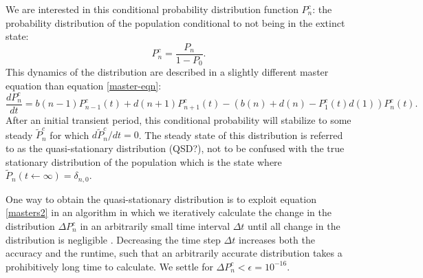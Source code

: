 \documentclass[a4paper,10pt]{article}
\numberwithin{equation}{section} %
\begin{document}
We are interested in this conditional probability distribution function $P_n^c$: the probability distribution of the population conditional to not being in the extinct state: %
\begin{equation*}
P_n^c = \frac{P_n}{1-P_0}.
\end{equation*}
This dynamics of the distribution are described in a slightly different master equation than equation \ref{master-eqn}:
\begin{equation}
\frac{dP_n^c}{dt} =  b(n-1)P_{n-1}^c(t) + d(n+1)P_{n+1}^c(t) - (b(n) + d(n) - P_1^c(t)d(1))P_n^c(t). 
\label{masters2}
\end{equation}
After an initial transient period, this conditional probability will stabilize to some steady $\tilde{P}^c_n$ for which $d\tilde{P}_n^c/dt=0$. 
The steady state of this distribution is referred to as the quasi-stationary distribution (QSD?), not to be confused with the true stationary distribution of the population which is the state where $\tilde{P}_n(t \leftarrow \infty)=\delta_{n,0}$. 

One way to obtain the quasi-stationary distribution is to exploit equation \ref{masters2} in an algorithm in which we iteratively calculate the change in the distribution $\Delta P^c_n$ in an arbitrarily small time interval $\Delta t$ until all change in the distribution is negligible \cite{Nisbet1982}.
Decreasing the time step $\Delta t$ increases both the accuracy and the runtime, such that an arbitrarily accurate distribution takes a prohibitively long time to calculate. 
We settle for $\Delta P^c_n<\epsilon = 10^{-16}$. %
\end{document}
